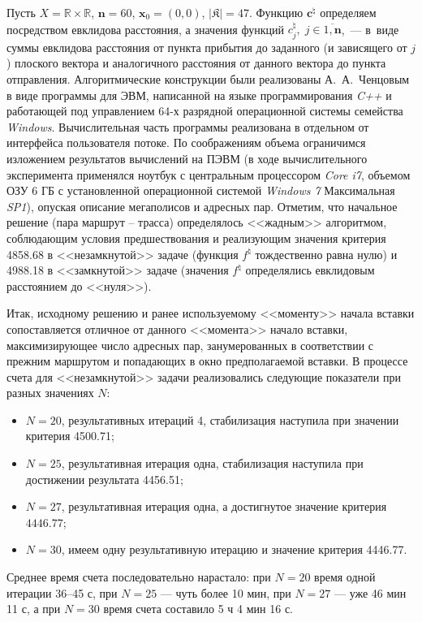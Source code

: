 Пусть
$X=\mathbb{R}\times\mathbb{R}$, $\mathbf{n}=60$,
$\mathbf{x}_0=(0,0)$,
$\vert \mathfrak{K} \vert=47$.
Функцию $\mathbf{c}^{\natural}$
определяем посредством евклидова расстояния,
а значения функций
$c_j^{\natural},\;j \in \overline{1,\mathbf{n}}$,~---
в~виде суммы евклидова расстояния от пункта прибытия до заданного
(и зависящего от $j$)
плоского вектора и аналогичного расстояния от данного
вектора до пункта отправления.
Алгоритмические конструкции были реализованы
А.~А.~Ченцовым в виде программы для ЭВМ,
написанной на языке программирования {\it C++}
и работающей под управлением 64-х разрядной операционной
системы семейства {\it Windows}.
Вычислительная часть программы реализована в отдельном от интерфейса пользователя потоке.
По соображениям объема ограничимся изложением результатов вычислений на ПЭВМ
(в ходе вычислительного эксперимента применялся ноутбук с центральным процессором
{\it Core i7}, объемом ОЗУ 6 ГБ
с установленной операционной системой
{\it Windows 7} Максимальная {\it SP1}),
опуская описание мегаполисов и адресных пар.
Отметим, что
начальное решение (пара маршрут -- трасса)
определялось <<жадным>> алгоритмом, соблюдающим условия предшествования
и реализующим значения критерия 4858.68 в <<незамкнутой>> задаче
(функция $f^{\natural}$ тождественно равна нулю)
и 4988.18 в <<замкнутой>> задаче
(значения $f^{\natural}$ определялись евклидовым расстоянием до <<нуля>>).

Итак, исходному решению и ранее используемому <<моменту>> начала
вставки сопоставляется отличное от данного <<момента>> начало вставки,
максимизирующее число адресных пар,
занумерованных в соответствии с прежним маршрутом и попадающих в
окно предполагаемой вставки.
В процессе счета для <<незамкнутой>> задачи
реализовались следующие показатели
при разных значениях $N$:

\begin{itemize}
  \item
  $N=20$, результативных итераций 4, стабилизация наступила при значении критерия 4500.71;
  \item
  $N=25$, результативная итерация одна, стабилизация наступила при достижении результата 4456.51;
  \item
  $N=27$, результативная итерация одна, а достигнутое значение критерия $4446.77$;
  \item
  $N=30$, имеем одну результативную итерацию и значение критерия 4446.77.
\end{itemize}

Среднее время счета последовательно нарастало:
при $N=20$ время одной итерации 36--45 с,
при $N=25$ --- чуть более 10 мин,
при $N=27$ --- уже 46 мин 11 с,
а при $N=30$ время счета составило 5 ч 4 мин 16 с.

